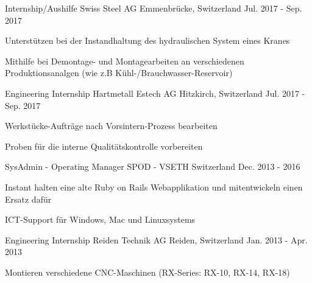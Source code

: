 

\begin{cventries}

\cventry
{Internship/Aushilfe} %
{Swiss Steel AG} %
{Emmenbrücke, Switzerland} %
{Jul. 2017 - Sep. 2017} %
{
	\begin{cvitems} %
		\item {Unterstützen bei der Instandhaltung des hydraulischen System eines Kranes}
		\item {Mithilfe bei Demontage- und Montagearbeiten an verschiedenen Produktionsanalgen (wie z.B Kühl-/Brauchwasser-Reservoir)}
	\end{cvitems}
}	
\cventry
{Engineering Internship} %
{Hartmetall Estech AG} %
{Hitzkirch, Switzerland} %
{Jul. 2017 - Sep. 2017} %
{
	\begin{cvitems} %
		\item {Werkstücke-Aufträge nach Vorsintern-Prozess bearbeiten}
		\item {Proben für die interne Qualitätskontrolle vorbereiten}
	\end{cvitems}
}

  \cventry
    {SysAdmin - Operating Manager} %
    {SPOD - VSETH} %
    {Switzerland} %
    {Dec. 2013 - 2016} %
    {
      \begin{cvitems} %
        \item {Instant halten eine alte Ruby on Rails Webapplikation und mitentwickeln einen Ersatz dafür}
        \item {ICT-Support für Windows, Mac und Linuxsystems}
      \end{cvitems}
    }

  \cventry
    {Engineering Internship} %
    {Reiden Technik AG} %
    {Reiden, Switzerland} %
    {Jan. 2013 - Apr. 2013} %
    {
      \begin{cvitems} %
        \item {Montieren verschiedene CNC-Maschinen (RX-Series: RX-10, RX-14, RX-18)}
      \end{cvitems}
    }


\end{cventries}
